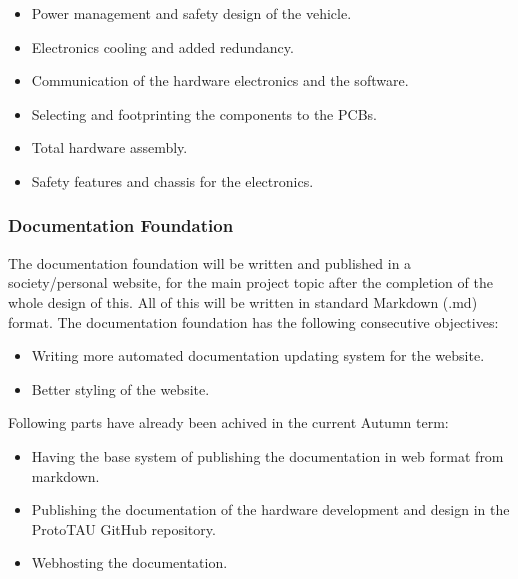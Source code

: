 \documentclass[
  10pt,
]{article}
\providecommand{\tightlist}{%
  \setlength{\itemsep}{0pt}\setlength{\parskip}{0pt}}
\begin{document}
\begin{itemize}
\tightlist
\item
  Power management and safety design of the vehicle.
\item
  Electronics cooling and added redundancy.
\item
  Communication of the hardware electronics and the software.
\item
  Selecting and footprinting the components to the PCBs.
\item
  Total hardware assembly.
\item
  Safety features and chassis for the electronics.
\end{itemize}

\hypertarget{documentation-foundation}{%
\subsubsection{Documentation
Foundation}\label{documentation-foundation}}

The documentation foundation will be written and published in a
society/personal website, for the main project topic after the
completion of the whole design of this. All of this will be written in
standard Markdown (.md) format. The documentation foundation has the
following consecutive objectives:

\begin{itemize}
\tightlist
\item
  Writing more automated documentation updating system for the website.
\item
  Better styling of the website.
\end{itemize}

Following parts have already been achived in the current Autumn term:

\begin{itemize}
\tightlist
\item
  Having the base system of publishing the documentation in web format
  from markdown.
\item
  Publishing the documentation of the hardware development and design in
  the ProtoTAU GitHub repository.
\item
  Webhosting the documentation.
\end{itemize}
\end{document}
